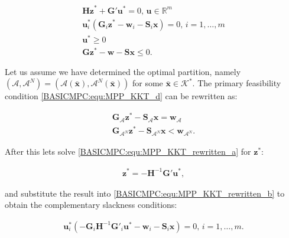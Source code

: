     \begin{subequations}
    \label{BASICMPC:equ:MPP_KKT}
        \begin{align}
        \textbf{Hz}^*+\textbf{G}'\textbf{u}^*=0,\,\textbf{u}\in\mathbb{R}^m        \label{BASICMPC:equ:MPP_KKT_a} \\
        \textbf{u}^*_i(\textbf{G}_i\textbf{z}^*-\textbf{w}_i-\textbf{S}_i\textbf{x})=0,\,i=1,\dots,m \label{BASICMPC:equ:MPP_KKT_b} \\
        \textbf{u}^*\geq 0 \label{BASICMPC:equ:MPP_KKT_c} \\
        \textbf{G}\textbf{z}^*-\textbf{w}-\textbf{S}\textbf{x}\leq 0 \label{BASICMPC:equ:MPP_KKT_d}.
    \end{align}
    \end{subequations}

    Let us assume we have determined the optimal partition, namely $(\mathcal{A},\mathcal{A}^N)=(\mathcal{A}(\bar{\textbf{x}}),\mathcal{A}^N(\bar{\textbf{x}}))$ for some $\bar{\textbf{x}}\in\mathcal{K}^*$. The primary feasibility condition \ref{BASICMPC:equ:MPP_KKT_d} can be rewritten as:

    \begin{subequations}
    \label{BASICMPC:equ:MPP_KKT_rewritten}
        \begin{align}
         \textbf{G}_{\mathcal{A}}\textbf{z}^*-\textbf{S}_{\mathcal{A}}\textbf{x}=\textbf{w}_{\mathcal{A}} \label{BASICMPC:equ:MPP_KKT_rewritten_a}\\
         \textbf{G}_{\mathcal{A}^N}\textbf{z}^*-\textbf{S}_{\mathcal{A}^N}\textbf{x}<\textbf{w}_{\mathcal{A}^N}. \label{BASICMPC:equ:MPP_KKT_rewritten_b}
    \end{align}
    \end{subequations}

    After this lets solve \ref{BASICMPC:equ:MPP_KKT_rewritten_a} for $\textbf{z}^*$:

    \begin{equation}
    \begin{array}{rcl}
            \textbf{z}^*=-\textbf{H}^{-1}\textbf{G}'\textbf{u}^*,

        \end{array}
        \label{BASICMPC:equ:MPP_quadratic_solvedfor_z}
    \end{equation}

    and substitute the result into \ref{BASICMPC:equ:MPP_KKT_rewritten_b} to obtain the complementary slackness conditions:

    \begin{equation}
    \begin{array}{rcl}
            \textbf{u}^*_i(-\textbf{G}_i\textbf{H}^{-1}\textbf{G}'_i\textbf{u}^*-\textbf{w}_i-\textbf{S}_i\textbf{x})=0,\,i=1,\dots,m.
        \end{array}
        \label{BASICMPC:equ:MPP_quadratic_slackness}
    \end{equation}

